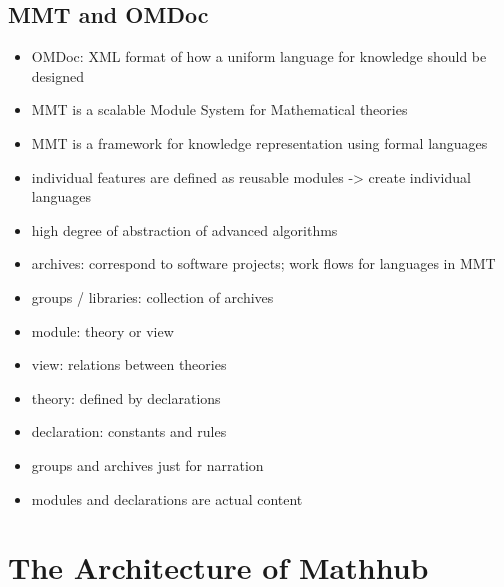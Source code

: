 \documentclass[11pt,a4paper]{article}
\begin{document}
\subsection{MMT and OMDoc}
\begin{itemize}
\item OMDoc: XML format of how a uniform language for knowledge should be designed
\item MMT is a scalable Module System for Mathematical theories
\item MMT is a framework for knowledge representation using formal languages
\item individual features are defined as reusable modules -> create individual languages
\item high degree of abstraction of advanced algorithms
\item archives: correspond to software projects; work flows for languages in MMT
\item groups / libraries: collection of archives
\item module: theory or view
\item view: relations between theories
\item theory: defined by declarations
\item declaration: constants and rules
\item groups and archives just for narration
\item modules and declarations are actual content
\cite{mmt}
\end{itemize}
 
\section{The Architecture of Mathhub}

\providecommand\myxscale{.95}
\providecommand\myyscale{1}
\end{document}
